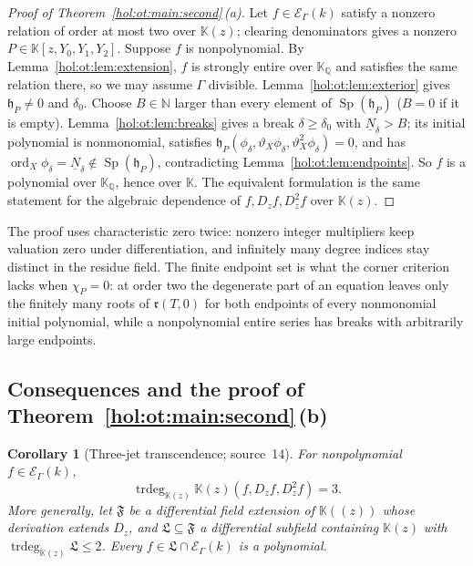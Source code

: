 \documentclass[11pt]{article}
\numberwithin{equation}{section}
\newtheorem{corollary}[theorem]{Corollary}
\theoremstyle{definition}
\theoremstyle{remark}
\newcommand{\Q}{\mathbb Q}
\newcommand{\N}{\mathbb N}
\newcommand{\KK}{\mathbb K}
\newcommand{\EK}{\mathcal E_\Gamma(k)}
\newcommand{\trdeg}{\operatorname{trdeg}}
\begin{document}
\begin{proof}[Proof of Theorem~\ref{hol:ot:main:second}\,\textup{(a)}]
Let $f\in\EK$ satisfy a nonzero relation of order at most two over $\KK(z)$;
clearing denominators gives a nonzero $P\in\KK[z,Y_0,Y_1,Y_2]$. Suppose $f$ is
nonpolynomial. By Lemma~\ref{hol:ot:lem:extension}, $f$ is strongly entire
over $\KK_\Q$ and satisfies the same relation there, so we may assume $\Gamma$
divisible. Lemma~\ref{hol:ot:lem:exterior} gives $\mathfrak h_P\ne0$ and
$\delta_0$. Choose $B\in\N$ larger than every element of
$\operatorname{Sp}(\mathfrak h_P)$ ($B=0$ if it is empty).
Lemma~\ref{hol:ot:lem:breaks} gives a break $\delta\ge\delta_0$ with
$\underline N_\delta>B$; its initial polynomial is nonmonomial, satisfies
$\mathfrak h_P(\phi_\delta,\vartheta_X\phi_\delta,\vartheta_X^2\phi_\delta)=0$,
and has $\operatorname{ord}_X\phi_\delta=\underline N_\delta\notin
\operatorname{Sp}(\mathfrak h_P)$, contradicting
Lemma~\ref{hol:ot:lem:endpoints}. So $f$ is a polynomial over $\KK_\Q$, hence
over $\KK$. The equivalent formulation is the same statement for the
algebraic dependence of $f,D_zf,D_z^2f$ over $\KK(z)$.
\end{proof}

The proof uses characteristic zero twice: nonzero integer multipliers keep
valuation zero under differentiation, and infinitely many degree indices stay
distinct in the residue field. The finite endpoint set is what the corner
criterion lacks when $\chi_P=0$: at order two the degenerate part of an
equation leaves only the finitely many roots of $\mathfrak r(T,0)$ for both
endpoints of every nonmonomial initial polynomial, while a nonpolynomial
entire series has breaks with arbitrarily large endpoints.

\subsection{Consequences and the proof of Theorem~\ref{hol:ot:main:second}\,(b)}
\label{hol:ot:sub:consequences}

\begin{corollary}[Three-jet transcendence; source~14]
\label{hol:ot:cor:threejets}
For nonpolynomial $f\in\EK$,
\[
 \trdeg_{\KK(z)}\KK(z)(f,D_zf,D_z^2f)=3 .
\]
More generally, let $\mathfrak F$ be a
differential field extension of $\KK((z))$ whose derivation extends $D_z$, and
$\mathfrak L\subseteq\mathfrak F$ a differential subfield containing $\KK(z)$ with
$\trdeg_{\KK(z)}\mathfrak L\le2$. Every $f\in\mathfrak L\cap\EK$ is a polynomial.
\end{corollary}
\end{document}
